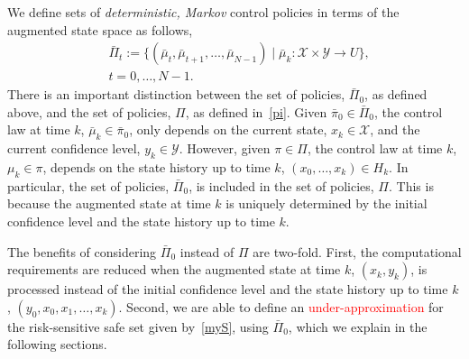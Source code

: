 \documentclass[letterpaper, 10 pt, conference]{ieeeconf}  %
\begin{document}
We define sets of \textit{deterministic, Markov} control policies in terms of the augmented state space as follows,
%
\begin{equation}
\label{augpi}
\begin{aligned}
& \bar{\Pi}_t := \{ (\bar{\mu}_t, \bar{\mu}_{t+1}, \dots, \bar{\mu}_{N-1}) \mid \bar{\mu}_k: \mathcal{X} \times \mathcal{Y} \rightarrow U \},\\
& t = 0, \dots, N-1.
\end{aligned}
\end{equation}
%
There is an important distinction between the set of policies, $\bar{\Pi}_0$, as defined above,
and the set of policies, $\Pi$, as defined in~\eqref{pi}.
Given $\bar{\pi}_0 \in \bar{\Pi}_0$, the control law at time $k$, $\bar{\mu}_k \in \bar{\pi}_0$, 
only depends on the current state, $x_k \in \mathcal{X}$, and the current confidence level, $y_k \in \mathcal{Y}$.
However, given $\pi \in \Pi$, the control law at time $k$, $\mu_k \in \pi$, 
depends on the state history up to time $k$, $(x_0, \dots, x_k) \in H_k$.
In particular, the set of policies, $\bar{\Pi}_0$, is included in the set of policies, $\Pi$.
This is because the augmented state at time $k$ is uniquely determined by the initial confidence level and the state history up to time $k$.\footnotemark 
{}

The benefits of considering $\bar{\Pi}_0$ instead of $\Pi$ are two-fold. 
First, the computational requirements are reduced when the augmented state at time $k$, $(x_k, y_k)$, 
is processed instead of the initial confidence level and the state history up to time $k$, $(y_0, x_0, x_1, \hdots, x_k)$. 
Second, we are able to define an \textcolor{red}{under-approximation}
for the risk-sensitive safe set given by~\eqref{myS}, using $\bar{\Pi}_0$, which we explain in the following sections.
%
\end{document}
